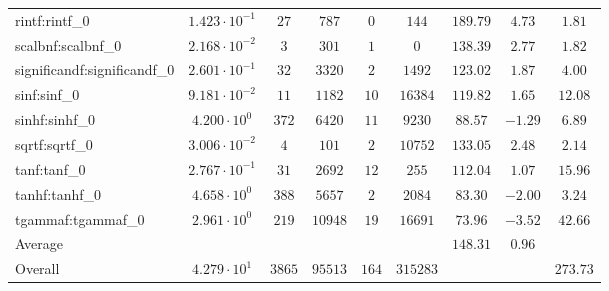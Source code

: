 \begin{tabular}{|l|c|c|c|c|c|c|c|c|}
rintf:rintf\_0               & $ 1.423 \cdot 10^{-1} $ & $ 27     $ & $ 787   $ & $ 0   $ & $ 144    $ & $ 189.79      $ & $ 4.73    $ & $ 1.81    $ \\
scalbnf:scalbnf\_0           & $ 2.168 \cdot 10^{-2} $ & $ 3      $ & $ 301   $ & $ 1   $ & $ 0      $ & $ 138.39      $ & $ 2.77    $ & $ 1.82    $ \\
significandf:significandf\_0 & $ 2.601 \cdot 10^{-1} $ & $ 32     $ & $ 3320  $ & $ 2   $ & $ 1492   $ & $ 123.02      $ & $ 1.87    $ & $ 4.00    $ \\
sinf:sinf\_0                 & $ 9.181 \cdot 10^{-2} $ & $ 11     $ & $ 1182  $ & $ 10  $ & $ 16384  $ & $ 119.82      $ & $ 1.65    $ & $ 12.08   $ \\
sinhf:sinhf\_0               & $ 4.200 \cdot 10^{0}  $ & $ 372    $ & $ 6420  $ & $ 11  $ & $ 9230   $ & $ 88.57       $ & $ -1.29   $ & $ 6.89    $ \\
sqrtf:sqrtf\_0               & $ 3.006 \cdot 10^{-2} $ & $ 4      $ & $ 101   $ & $ 2   $ & $ 10752  $ & $ 133.05      $ & $ 2.48    $ & $ 2.14    $ \\
tanf:tanf\_0                 & $ 2.767 \cdot 10^{-1} $ & $ 31     $ & $ 2692  $ & $ 12  $ & $ 255    $ & $ 112.04      $ & $ 1.07    $ & $ 15.96   $ \\
tanhf:tanhf\_0               & $ 4.658 \cdot 10^{0}  $ & $ 388    $ & $ 5657  $ & $ 2   $ & $ 2084   $ & $ 83.30       $ & $ -2.00   $ & $ 3.24    $ \\
tgammaf:tgammaf\_0           & $ 2.961 \cdot 10^{0}  $ & $ 219    $ & $ 10948 $ & $ 19  $ & $ 16691  $ & $ 73.96       $ & $ -3.52   $ & $ 42.66   $ \\
\hline
Average                      & $                     $ & $        $ & $       $ & $     $ & $        $ & $ 148.31      $ & $ 0.96    $ & $         $ \\
\hline
Overall                      & $ 4.279 \cdot 10^{1}  $ & $ 3865   $ & $ 95513 $ & $ 164 $ & $ 315283 $ & $             $ & $         $ & $ 273.73  $ \\
\hline
\end{tabular}
